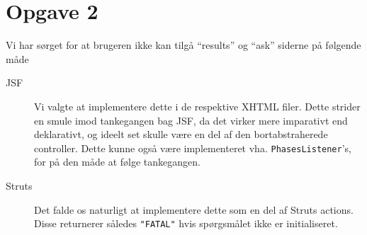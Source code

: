 \documentclass[a4paper,10pt]{article}
\begin{document}
\section*{Opgave 2}

Vi har sørget for at brugeren ikke kan tilgå ``results'' og ``ask'' siderne på følgende måde
\begin{description}
\item[JSF] Vi valgte at implementere dette i de respektive XHTML filer. Dette strider en smule imod tankegangen bag JSF, da det virker mere imparativt end deklarativt, og ideelt set skulle være en del af den bortabstraherede controller. Dette kunne også være implementeret vha. \texttt{PhasesListener}'s, for på den måde at følge tankegangen. 
\item[Struts] Det falde os naturligt at implementere dette som en del af Struts actions. Disse returnerer således \texttt{"FATAL"} hvis spørgsmålet ikke er initialiseret. 
\end{description}
\end{document}
